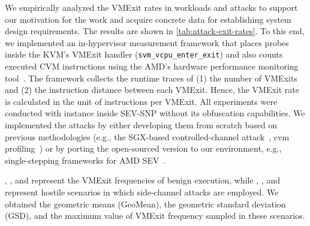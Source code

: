 \label{subsec:empirical-analysis}
We empirically analyzed the VMExit rates in workloads and attacks to support our motivation for the work and acquire concrete data for establishing system design requirements.
The results are shown in \autoref{tab:attack-exit-rates}.
To this end, we implemented an in-hypervisor measurement framework that places probes inside the KVM's VMExit handler (\texttt{svm\_vcpu\_enter\_exit}) and also counts executed CVM instructions using {the AMD's hardware performance monitoring tool~\cite{amd-perf}}.
The framework collects the runtime traces of (1) the number of VMExits and (2) the instruction distance between each VMExit.
Hence, the VMExit rate is calculated in the unit of instructions per VMExit.
All experiments were conducted with \thename instance inside SEV-SNP without its obfuscation capabilities.
We implemented the attacks by either developing them from scratch based on previous methodologies (e.g., the SGX-based controlled-channel attack~\cite{xu2015controlledchannel}, \gls{cvm} profiling~\cite{heckler}) or by porting the open-sourced version to our environment, e.g., single-stepping frameworks for AMD SEV~\cite{cachewarp,sevstep}.

\lnormal, \lnginx, and \lredis represent the VMExit frequencies of benign execution, while \llenpf, \lnpf, and \lss represent hostile scenarios in which side-channel attacks are employed.
We obtained the geometric means (GeoMean), the geometric standard deviation (GSD), and the maximum value of VMExit frequency sampled in these scenarios.

\begin{table}[t]
	\scriptsize
	\centering
	
	\caption{SEV-SNP \gls{cvm} VMExit frequency (exits/isns) in benign workloads and attacks.
		\llenpf were performed on LibJPEG (\cref{subsec:jpeg-attack}), \lnpf and \lss were performed on Redis workload.}
	\label{tab:attack-exit-rates}
\end{table}



